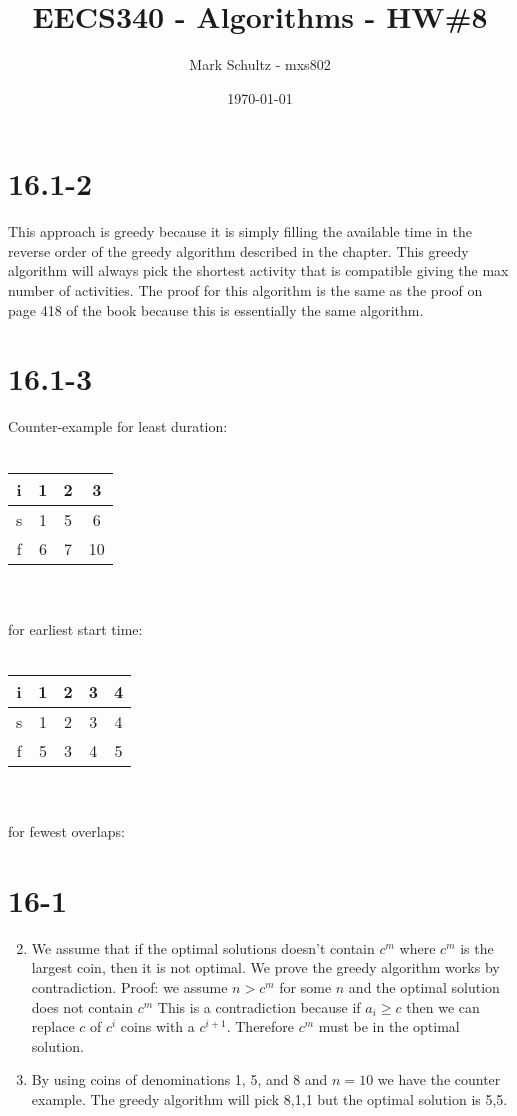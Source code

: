 \documentclass[11pt]{article}
\begin{document}
\title{EECS340 - Algorithms - HW\#8}
\date{\today}
\author{Mark Schultz - mxs802}
\maketitle
\vspace{1.5in}
\section*{16.1-2}
This approach is greedy because it is simply filling the available time in the reverse order of the greedy algorithm described in the chapter. This greedy algorithm will always pick the shortest activity that is compatible giving the max number of activities. The proof for this algorithm is the same as the proof on page 418 of the book because this is essentially the same algorithm.

\section*{16.1-3}
Counter-example for least duration:\\
\\
\begin{tabular}{| c | c | c | c |}
\hline
i & 1 & 2 & 3 \\
\hline
s & 1 & 5 & 6\\
f & 6 & 7 & 10\\
\hline
\end{tabular}
\\
\\
for earliest start time: \\
\\
\begin{tabular}{| c | c | c | c | c |}
\hline
i & 1 & 2 & 3 & 4\\
\hline
s & 1 & 2 & 3 & 4\\
f & 5 & 3 & 4 & 5\\
\hline
\end{tabular}
\\
\\
for fewest overlaps:
\vspace{1in}
\section*{16-1}
\begin{enumerate}
\setcounter{enumi}{1}
\item We assume that if the optimal solutions doesn't contain $c^m$ where $c^m$ is the largest coin, then it is not optimal. We prove the greedy algorithm works by contradiction. Proof: we assume $n > c^m$ for some $n$ and the optimal solution does not contain $c^m$ This is a contradiction because if $a_i \geq c$ then we can replace $c$ of $c^i$ coins with a $c^{i+1}$. Therefore $c^m$ must be in the optimal solution.
\item By using coins of denominations 1, 5, and 8 and $n=10$ we have the counter example. The greedy algorithm will pick 8,1,1 but the optimal solution is 5,5.

\end{enumerate}
\end{document}
